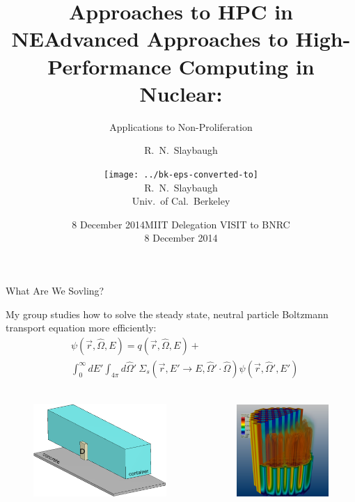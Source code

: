 \documentclass[xcolor=x11names,compress]{beamer}
\title{Approaches to HPC in NE}
\author{R.\ N.\ Slaybaugh}
\date{8 December 2014}
\renewcommand{\(}{\begin{columns}}
\renewcommand{\)}{\end{columns}}
\newcommand{\<}[1]{\begin{column}{#1}}
\renewcommand{\>}{\end{column}}
\newcommand{\Macro}{\ensuremath{\Sigma}}
\newcommand{\vOmega}{\ensuremath{\hat{\Omega}}}
\begin{document}
\begin{frame}
\title{Advanced Approaches to High-Performance Computing in Nuclear:}
\subtitle{Applications to Non-Proliferation}
\author{\texttt{[image: ../bk-eps-converted-to]}\\R.\ N.\ Slaybaugh \\ Univ.\ of Cal.\ Berkeley}

\date{MIIT Delegation VISIT to BNRC \\ 8 December 2014}
\titlepage
\end{frame}

\begin{frame}{What Are We Sovling?}

    My group studies how to solve the steady state, neutral particle Boltzmann
    transport equation more efficiently:
    \begin{align}
    [\vOmega \cdot \nabla + \Macro(\vec{r}, E)] &\psi(\vec{r}, \vOmega, E)  =  q(\vec{r}, \vOmega, E) + \nonumber\\
     &\int_0^{\infty} dE' \int_{4\pi} d\vOmega' \:\Macro_{s}(\vec{r}, E' \to E,
     \vOmega' \cdot \vOmega) \psi(\vec{r}, \vOmega', E') \nonumber
    \end{align}
    
    \begin{columns}
    \begin{column}{0.55\textwidth}     
 	   \begin{center}
 	   \begin{figure}
 	   \includegraphics[height=1.5in,clip]{../figs/cargo-container}
       \end{figure}
 	   \end{center}
  	\end{column}
 	\begin{column}{0.4\textwidth}
 	   \begin{center}
 	   \begin{figure}     
 	   \includegraphics[height=1.5in,clip]{../figs/denovo-pwr}
 	   \end{figure}
 	   \end{center}
  	\end{column}
    \end{columns}
   
\end{frame}
\end{document}
